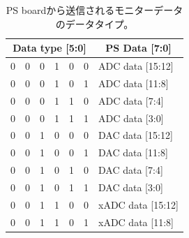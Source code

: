 \begin{table}[]
    \centering
    \caption[PS boardから送信されるモニターデータのデータタイプ]{PS boardから送信されるモニターデータのデータタイプ。}
    \label{tab:PSBdatatype}
    \begin{tabular}{|cccccc|l|}
    \hline
    \multicolumn{6}{|c}{Data type {[}5:0{]}}                                                                                       & \multicolumn{1}{|c|}{PS Data {[}7:0{]}} \\ \hline\hline
    \multicolumn{1}{|c}{0} & 0                      & 0                      & 1                      & 0                      & 0 & ADC data {[}15:12{]}                   \\  
    \multicolumn{1}{|c}{0} & 0                      & 0                      & 1                      & 0                      & 1 & ADC data {[}11:8{]}                    \\  
    \multicolumn{1}{|c}{0} & 0                      & 0                      & 1                      & 1                      & 0 & ADC data {[}7:4{]}                     \\  
    \multicolumn{1}{|c}{0} & 0                      & 0                      & 1                      & 1                      & 1 & ADC data {[}3:0{]}                     \\  \hline
    \multicolumn{1}{|c}{0} & 0                      & 1                      & 0                      & 0                      & 0 & DAC data {[}15:12{]}                   \\  
    \multicolumn{1}{|c}{0} & 0                      & 1                      & 0                      & 0                      & 1 & DAC data {[}11:8{]}                    \\  
    \multicolumn{1}{|c}{0} & 0                      & 1                      & 0                      & 1                      & 0 & DAC data {[}7:4{]}                     \\  
    \multicolumn{1}{|c}{0} & 0                      & 1                      & 0                      & 1                      & 1 & DAC data {[}3:0{]}                     \\  \hline
    \multicolumn{1}{|c}{0} & 0                      & 1                      & 1                      & 0                      & 0 & xADC data {[}15:12{]}                  \\  
    \multicolumn{1}{|c}{0} & 0                      & 1                      & 1                      & 0                      & 1 & xADC data {[}11:8{]}                   \\  

\end{tabular}
\end{table}
